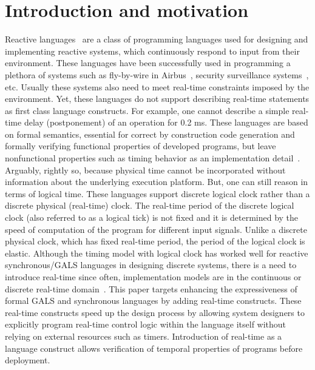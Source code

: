 \section{Introduction and motivation}
\label{sec:intr-motiv}

Reactive languages~\cite{gber931,amal10} are a class of programming
languages used for designing and implementing reactive systems, which
continuously respond to input from their environment. These languages
have been successfully used in programming a plethora of systems such as
fly-by-wire in Airbus~\cite{eairbus}, security surveillance
systems~\cite{amal121}, etc. Usually these systems also need to meet
real-time constraints imposed by the environment. Yet, these languages
do not support describing real-time statements as first class language
constructs.  For example, one cannot describe a simple real-time delay
(postponement) of an operation for 0.2 ms. These languages are based on
formal semantics, essential for correct by construction code generation
and formally verifying functional properties of developed programs, but
leave nonfunctional properties such as timing behavior as an
implementation detail~\cite{boldt07}. Arguably, rightly so, because
physical time cannot be incorporated without information about the
underlying execution platform.  But, one can still reason in terms of
logical time. These languages support discrete logical clock rather than
a discrete physical (real-time) clock. The real-time period of the
discrete logical clock (also referred to as a logical tick) is not fixed
and it is determined by the speed of computation of the program for
different input signals. Unlike a discrete physical clock, which has
fixed real-time period, the period of the logical clock is elastic.
Although the timing model with logical clock has worked well for
reactive synchronous/GALS languages in designing discrete systems, there
is a need to introduce real-time since often, implementation models are
in the continuous or discrete real-time
domain~\cite{DBLP:journals/pieee/SifakisTY03}. This paper targets
enhancing the expressiveness of formal GALS and synchronous languages by
adding real-time constructs. These real-time constructs speed up the
design process by allowing system designers to explicitly program
real-time control logic within the language itself without relying on
external resources such as timers. Introduction of real-time as a
language construct allows verification of temporal properties of
programs before deployment.


